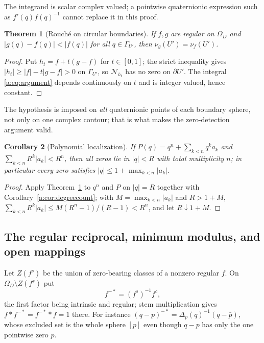 \documentclass[11pt,a4paper]{article}
\numberwithin{equation}{section}
\newtheorem{theorem}{Theorem}[section]
\newtheorem{corollary}[theorem]{Corollary}
\theoremstyle{definition}
\theoremstyle{remark}
\theoremstyle{plain}
\newcommand{\Om}{\Omega}
\newcommand{\abs}[1]{\lvert #1\rvert}
\begin{document}
The integrand is scalar complex valued; a pointwise quaternionic expression
such as $f'(q)f(q)^{-1}$ cannot replace it in this proof.

\begin{theorem}[Rouch\'e on circular boundaries]
\label{a:thm:rouche}
If $f,g$ are regular on $\Om_D$ and $\abs{g(q)-f(q)}<\abs{f(q)}$ for all
$q\in\Gamma_{U'}$, then $\nu_g(U')=\nu_f(U')$.
\end{theorem}

\begin{proof}
Put $h_t=f+t(g-f)$ for $t\in[0,1]$; the strict inequality gives
$\abs{h_t}\ge\abs f-t\abs{g-f}>0$ on $\Gamma_{U'}$, so $\mathcal N_{h_t}$ has
no zero on $\partial U'$. The integral \eqref{a:eq:argument} depends
continuously on $t$ and is integer valued, hence constant.
\end{proof}

The hypothesis is imposed on \emph{all} quaternionic points of each boundary
sphere, not only on one complex contour; that is what makes the
zero-detection argument valid.

\begin{corollary}[Polynomial localization]
\label{a:cor:localization}
If $P(q)=q^n+\sum_{k<n}q^ka_k$ and $\sum_{k<n}R^k\abs{a_k}<R^n$, then all
zeros lie in $\abs q<R$ with total multiplicity $n$; in particular every zero
satisfies $\abs q\le1+\max_{k<n}\abs{a_k}$.
\end{corollary}

\begin{proof}
Apply Theorem~\ref{a:thm:rouche} to $q^n$ and $P$ on $\abs q=R$ together with
Corollary~\ref{a:cor:degreecount}; with $M=\max_{k<n}\abs{a_k}$ and $R>1+M$,
$\sum_{k<n}R^k\abs{a_k}\le M(R^n-1)/(R-1)<R^n$, and let $R\downarrow1+M$.
\end{proof}

\subsection{The regular reciprocal, minimum modulus, and open mappings}
\label{a:sec:reciprocal}

Let $Z(f^s)$ be the union of zero-bearing classes of a nonzero regular $f$.
On $\Om_D\setminus Z(f^s)$ put
\begin{equation}
 f^{-*}=(f^s)^{-1}f^c ,
 \label{a:eq:reciprocal}
\end{equation}
the first factor being intrinsic and regular; stem multiplication gives
$f*f^{-*}=f^{-*}*f=1$ there. For instance
$(q-p)^{-*}=\Delta_p(q)^{-1}(q-\bar p)$, whose excluded set is the whole
sphere $[p]$ even though $q-p$ has only the one pointwise zero $p$.
\end{document}
